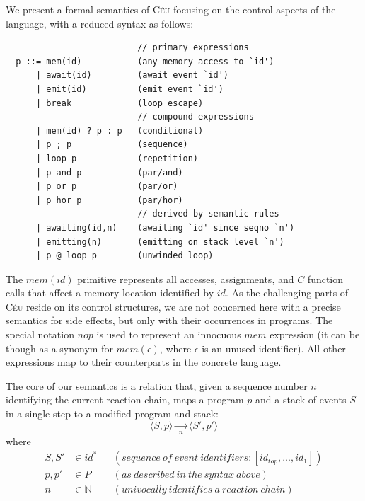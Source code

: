 \documentclass{acm_proc_article-sp}
\newcommand{\CEU}{\textsc{C\'{e}u}\xspace}
\newcommand{\LL}{\langle}
\newcommand{\RR}{\rangle}
\newcommand{\1}{\;}
\newcommand{\2}{\;\;}
\newcommand{\3}{\;\;\;}
\newcommand{\5}{\;\;\;\;\;}
\begin{document}
We present a formal semantics of \CEU focusing on the control aspects of the 
language, with a reduced syntax as follows:
%
{\small
\begin{verbatim}
                          // primary expressions
  p ::= mem(id)           (any memory access to `id')
      | await(id)         (await event `id')
      | emit(id)          (emit event `id')
      | break             (loop escape)
                          // compound expressions
      | mem(id) ? p : p   (conditional)
      | p ; p             (sequence)
      | loop p            (repetition)
      | p and p           (par/and)
      | p or p            (par/or)
      | p hor p           (par/hor)
                          // derived by semantic rules
      | awaiting(id,n)    (awaiting `id' since seqno `n')
      | emitting(n)       (emitting on stack level `n')
      | p @ loop p        (unwinded loop)
\end{verbatim}
}%
%
The $mem(id)$ primitive represents all accesses, assignments, and $C$ function 
calls that affect a memory location identified by $id$.
As the challenging parts of \CEU reside on its control structures, we are not 
concerned here with a precise semantics for side effects, but only with their 
occurrences in programs.
%
The special notation $nop$ is used to represent an innocuous $mem$ expression 
(it can be though as a synonym for $mem(\epsilon)$, where $\epsilon$ is an 
unused identifier).
%
All other expressions map to their counterparts in the concrete language.

The core of our semantics is a relation that, given a sequence number $n$ 
identifying the current reaction chain, maps a program $p$ and a stack of 
events $S$ in a single step to a modified program and stack:
%
$$
\LL S, p \RR
    \xrightarrow[~~n~~]{}
\LL S', p' \RR
$$
%
where
%
\begin{align*}
S, S' &\in id^*
    &&(sequence~of~event~identifiers: [id_{top}, ..., id_1]) \\
p, p' &\in P
    && (as~described~in~the~syntax~above) \\
n     &\in \mathds{N}
    && (univocally~identifies~a~reaction~chain)
\end{align*}
\end{document}

